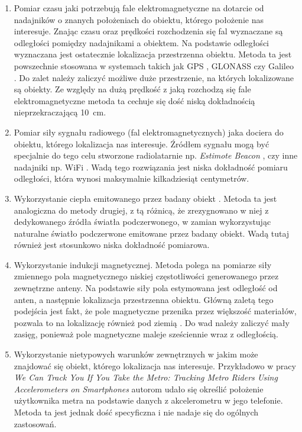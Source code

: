 \begin{enumerate}
 \item
 Pomiar czasu jaki potrzebują fale elektromagnetyczne na dotarcie od nadajników o znanych położeniach 
 do obiektu, którego położenie nas interesuje.
 Znając czasu oraz prędkości rozchodzenia się fal wyznaczane są odległości pomiędzy nadajnikami a obiektem.
 Na podstawie odległości wyznaczana jest ostatecznie lokalizacja przestrzenna obiektu. 
 Metoda ta jest powszechnie stosowana w systemach takich jak GPS \cite{bib:gps}, GLONASS \cite{bibGLONASS} czy Galileo \cite{bib:galileo}.
 Do zalet należy zaliczyć możliwe duże przestrzenie, na których lokalizowane są obiekty.
 Ze względy na dużą prędkość z jaką rozchodzą się fale elektromagnetyczne metoda ta cechuje się dość niską 
 dokładnością nieprzekraczającą \SI{10}{cm}.
 
 \item
 Pomiar siły sygnału radiowego (fal elektromagnetycznych) jaka dociera do obiektu, którego lokalizacja nas interesuje.
 Źródłem sygnału mogą być specjalnie do tego celu stworzone radiolatarnie np. \textit{Estimote Beacon} \cite{bib:beacon},
 czy inne nadajniki np. WiFi \cite{bib:lokWiFi}.
 Wadą tego rozwiązania jest niska dokładność pomiaru odległości, która wynosi maksymalnie kilkadziesiąt centymetrów.  
 
 \item
 Wykorzystanie ciepła emitowanego przez badany obiekt \cite{bib:PIRsens}.
 Metoda ta jest analogiczna do metody drugiej, z tą różnicą, że zrezygnowano w niej
 z dedykowanego źródła światła podczerwonego, w zamian wykorzystując naturalne światło podczerwone emitowane 
 przez badany obiekt. Wadą tutaj również jest stosunkowo niska dokładność pomiarowa.
 
 \item
 Wykorzystanie indukcji magnetycznej. Metoda polega na pomiarze siły zmiennego pola magnetycznego niskiej częstotliwości
 generowanego przez zewnętrzne anteny. Na podstawie siły pola estymowana jest odległość 
 od anten, a następnie lokalizacja przestrzenna obiektu.
 Główną zaletą tego podejścia jest fakt, że pole magnetyczne przenika przez większość materiałów, pozwala to na 
 lokalizację również pod ziemią \cite{bib:chomiki}. Do wad należy zaliczyć mały zasięg, ponieważ pole magnetyczne maleje 
 sześciennie wraz z odległością.   
 
 \item 
 Wykorzystanie nietypowych warunków zewnętrznych w jakim może znajdować się obiekt, którego lokalizacja nas interesuje.
 Przykładowo w pracy \textit{We Can Track You If You Take the Metro: Tracking Metro
Riders Using Accelerometers on Smartphones} \cite{bib:metro} autorom udało się określić położenie
użytkownika metra na podstawie danych z akcelerometru w jego telefonie.
Metoda ta jest jednak dość specyficzna i nie nadaje się do ogólnych zastosowań. 
 
\end{enumerate}
 

